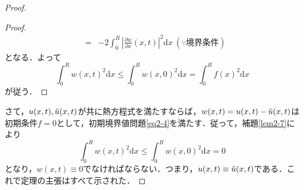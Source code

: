 \documentclass[a4j]{jsbook}
\numberwithin{theorem}{chapter}  %
\begin{document}
\begin{proof}
\begin{proof}
\begin{eqnarray*}
&=&-2\int_0^R\left|\frac{\partial w}{\partial x}(x, t)\right|^2\mathrm{d}x\ (\because\mbox{境界条件})
\end{eqnarray*}
となる．よって
\begin{equation*}
    \int_0^R w(x, t)^2\mathrm{d}x\leq\int_0^R w(x, 0)^2\mathrm{d}x=\int_0^R f(x)^2\mathrm{d}x
\end{equation*}
が従う．
\end{proof}
さて，\(u(x, t), \Tilde{u}(x, t)\)が共に熱方程式を満たすならば，\(w(x, t)=u(x, t)-\Tilde{u}(x, t)\)は初期条件\(f=0\)として，初期境界値問題\eqref{eq2-4}を満たす．従って，補題\ref{lem2-7}により
\begin{equation*}
    \int_0^R w(x, t)^2\mathrm{d}x\leq\int_0^R w(x, 0)^2\mathrm{d}x=0
\end{equation*}
となり，\(w(x, t)\equiv 0\)でなければならない．つまり，\(u(x, t)\equiv\Tilde{u}(x, t)\)である．これで定理の主張はすべて示された．
\end{proof}
\end{document}

